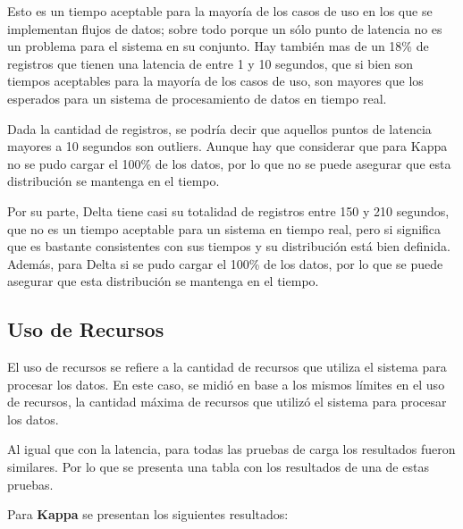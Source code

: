 Esto es un tiempo aceptable para la mayoría de los casos de uso en los que se implementan flujos de datos;
sobre todo porque un sólo punto de latencia no es un problema para el sistema en su conjunto.
Hay también mas de un 18\% de registros que tienen una latencia de entre 1 y 10 segundos, 
que si bien son tiempos aceptables para la mayoría de los casos de uso, son mayores que los esperados para un sistema de procesamiento de datos en tiempo real. \newline

Dada la cantidad de registros, se podría decir que aquellos puntos de latencia mayores a 10 segundos son outliers.
Aunque hay que considerar que para Kappa no se pudo cargar el 100\% de los datos,
por lo que no se puede asegurar que esta distribución se mantenga en el tiempo. \newline

Por su parte, Delta tiene casi su totalidad de registros entre 150 y 210 segundos,
que no es un tiempo aceptable para un sistema en tiempo real, 
pero si significa que es bastante consistentes con sus tiempos y su distribución está bien definida.
Además, para Delta si se pudo cargar el 100\% de los datos, por lo que se puede asegurar que esta distribución se mantenga en el tiempo.

\newpage

\newpage
\subsection{Uso de Recursos}

El uso de recursos se refiere a la cantidad de recursos que utiliza el sistema para procesar los datos.
En este caso, se midió en base a los mismos límites en el uso de recursos, 
la cantidad máxima de recursos que utilizó el sistema para procesar los datos. \newline

Al igual que con la latencia, para todas las pruebas de carga los resultados fueron similares. 
Por lo que se presenta una tabla con los resultados de una de estas pruebas. \newline

Para \textbf{Kappa} se presentan los siguientes resultados:

